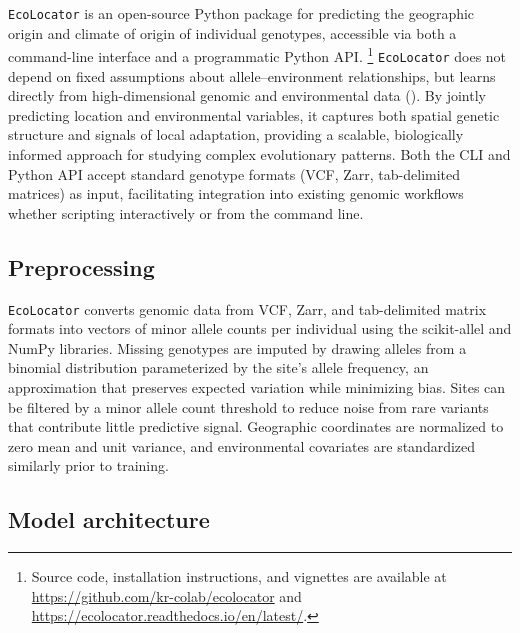 \documentclass[]{article}
\newcommand{\ecolocator}{\texttt{EcoLocator}\xspace}
\begin{document}
\ecolocator is an open-source Python package
for predicting the geographic origin and climate of origin
of individual genotypes, accessible via both a command-line 
interface and a programmatic Python API.
\footnote{Source code, installation instructions, and vignettes are available at \url{https://github.com/kr-colab/ecolocator} and \url{https://ecolocator.readthedocs.io/en/latest/}.}
\ecolocator does not depend on fixed assumptions about allele--environment relationships,
but learns directly from high-dimensional genomic
and environmental data ().
By jointly predicting location and environmental variables,
it captures both spatial genetic structure
and signals of local adaptation,
providing a scalable, biologically informed approach
for studying complex evolutionary patterns.
Both the CLI and Python API accept standard genotype formats 
(VCF, Zarr, tab-delimited matrices) as input,
facilitating integration into existing 
genomic workflows whether scripting interactively or from the command line.

\subsection{Preprocessing}

\ecolocator converts genomic data from VCF, Zarr,
and tab-delimited matrix formats
into vectors of minor allele counts per individual
using the scikit-allel \citep{scikit_allel_v1.3.8} and NumPy \citep{numpy_v2.0.0} libraries.
Missing genotypes are imputed by drawing alleles
from a binomial distribution parameterized
by the site's allele frequency,
an approximation that preserves expected variation
while minimizing bias.
Sites can be filtered by a minor allele count threshold
to reduce noise from rare variants
that contribute little predictive signal.
Geographic coordinates are normalized to zero mean and unit variance,
and environmental covariates are standardized similarly
prior to training.

\subsection{Model architecture}
\end{document}
